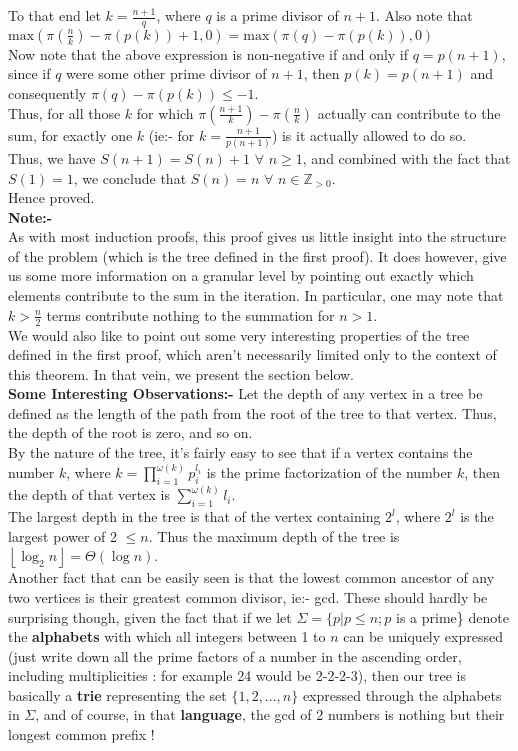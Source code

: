 \documentclass{article}
\begin{document}
To that end let $k = \frac{n+1}{q}$, where $q$ is a prime divisor of $n+1$. Also note that $\mathrm{max}(\pi(\frac{n}{k}) - \pi(p(k)) + 1, 0) = \mathrm{max}(\pi(q) - \pi(p(k)), 0)$\\
Now note that the above expression is non-negative if and only if $q = p(n+1)$, since if $q$ were some other prime divisor of $n+1$, then $p(k) = p(n+1)$ and consequently $\pi(q) - \pi(p(k)) \leq -1$.\\
Thus, for all those $k$ for which $\pi(\frac{n+1}{k}) - \pi(\frac{n}{k})$ actually can contribute to the sum, for exactly one $k$ (ie:- for $k = \frac{n+1}{p(n+1)}$) is it actually allowed to do so.\\
Thus, we have $S(n+1) = S(n) + 1$ $\forall$ $n \geq 1$, and combined with the fact that $S(1) = 1$, we conclude that $S(n) = n$ $\forall$ $n \in \mathbb{Z}_{>0}$.\\
Hence proved.\\
{\bf Note:-}\\
As with most induction proofs, this proof gives us little insight into the structure of the problem (which is the tree defined in the first proof). It does however, give us some more information on a granular level by pointing out exactly which elements contribute to the sum in the iteration. In particular, one may note that $k > \frac{n}{2}$ terms contribute nothing to the summation for $n > 1$.\\
We would also like to point out some very interesting properties of the tree defined in the first proof, which aren't necessarily limited only to the context of this theorem. In that vein, we present the section below.\\
\textbf{Some Interesting Observations:-} Let the depth of any vertex in a tree be defined as the length of the path from the root of the tree to that vertex. Thus, the depth of the root is zero, and so on. \\
By the nature of the tree, it's fairly easy to see that if a vertex contains the number $k$, where $k = \prod_{i=1}^{\omega(k)} p_i^{l_i}$ is the prime factorization of the number $k$, then the depth of that vertex is $\sum_{i=1}^{\omega(k)} l_i$.\\
The largest depth in the tree is that of the vertex containing $2^l$, where $2^l$ is the largest power of 2 $\leq n$. Thus the maximum depth of the tree is $\left \lfloor {\log_2n}\right \rfloor = \Theta(\log n)$.\\
Another fact that can be easily seen is that the lowest common ancestor of any two vertices is their greatest common divisor, ie:- gcd. These should hardly be surprising though, given the fact that if we let $\Sigma = \{p | p \leq n ; p$ is a prime\} denote the \textbf{alphabets} with which all integers between 1 to $n$ can be uniquely expressed (just write down all the prime factors of a number in the ascending order, including multiplicities : for example 24 would be 2-2-2-3), then our tree is basically a \textbf{trie} representing the set $\{1, 2, ..., n\}$ expressed through the alphabets in $\Sigma$, and of course, in that \textbf{language}, the gcd of 2 numbers is nothing but their longest common prefix !\\
\end{document}
